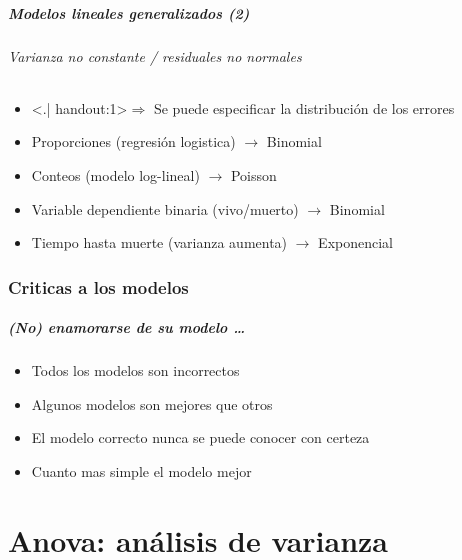 \documentclass[gray,handout,mathserif]{beamer}
\begin{document}
\begin{frame}[label=glm2]
   \frametitle{Modelos lineales generalizados (2)}
   \framesubtitle{Varianza no constante / residuales no normales}
    \begin{itemize}[<+-| handout:1>]
      \item[] \alert<.| handout:1>{$\Rightarrow$ Se puede especificar la distribuci\'on de los errores}
      \medskip
      \item<2-| handout:1> Proporciones (regresi\'on logistica) $\rightarrow$ Binomial
      \item<2-| handout:1> Conteos (modelo log-lineal) $\rightarrow$ Poisson
      \item<2-| handout:1> Variable dependiente binaria (vivo/muerto) $\rightarrow$ Binomial
      \item<2-| handout:1> Tiempo hasta muerte (varianza aumenta) $\rightarrow$ Exponencial
   \end{itemize}
\end{frame}%




\section{Criticas a los modelos}

\begin{frame}[label=modcrit1]
   \frametitle{(No) enamorarse de su modelo \ldots}
    \begin{itemize}
      \item Todos los modelos son incorrectos
      \item Algunos modelos son mejores que otros
      \item El modelo correcto nunca se puede conocer con certeza
      \item Cuanto mas simple el modelo mejor
   \end{itemize}
\end{frame}%







\part[Anova]{Anova: an\'alisis de varianza}
\end{document}
